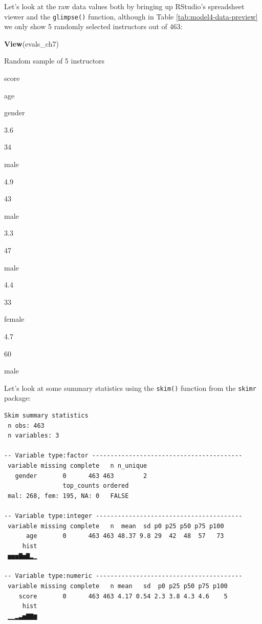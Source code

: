 \documentclass[12pt,]{krantz}
\makeatletter
\newenvironment{Shaded}{\begin{snugshade}}{\end{snugshade}}
\newcommand{\KeywordTok}[1]{\textcolor[rgb]{0.27,0.27,0.27}{\textbf{#1}}}
\newcommand{\StringTok}[1]{\textcolor[rgb]{0.5,0.5,0.5}{#1}}
\newcommand{\OperatorTok}[1]{\textcolor[rgb]{0.43,0.43,0.43}{\textbf{#1}}}
\newcommand{\NormalTok}[1]{#1}
\newenvironment{kframe}{%
\medskip{}
\setlength{\fboxsep}{.8em}
 \def\at@end@of@kframe{}%
 \ifinner\ifhmode%
  \def\at@end@of@kframe{\end{minipage}}%
  \begin{minipage}{\columnwidth}%
 \fi\fi%
 \def\FrameCommand##1{\hskip\@totalleftmargin \hskip-\fboxsep
 \colorbox{shadecolor}{##1}\hskip-\fboxsep
     \hskip-\linewidth \hskip-\@totalleftmargin \hskip\columnwidth}%
 \MakeFramed {\advance\hsize-\width
   \@totalleftmargin\z@ \linewidth\hsize
   \@setminipage}}%
 {\par\unskip\endMakeFramed%
 \at@end@of@kframe}
\renewenvironment{Shaded}{\begin{kframe}}{\end{kframe}}
\makeatother
\begin{document}
Let's look at the raw data values both by bringing up RStudio's
spreadsheet viewer and the \texttt{glimpse()} function, although in
Table \ref{tab:model4-data-preview} we only show 5 randomly selected
instructors out of 463:

\begin{Shaded}
\begin{Highlighting}[]
\KeywordTok{View}\NormalTok{(evals_ch7)}
\end{Highlighting}
\end{Shaded}

\label{tab:model4-data-preview}Random sample of 5 instructors

score

age

gender

3.6

34

male

4.9

43

male

3.3

47

male

4.4

33

female

4.7

60

male

Let's look at some summary statistics using the \texttt{skim()} function
from the \texttt{skimr} package:

\begin{Shaded}
\end{Shaded}

\begin{verbatim}
Skim summary statistics
 n obs: 463 
 n variables: 3 

-- Variable type:factor -----------------------------------------
 variable missing complete   n n_unique
   gender       0      463 463        2
                top_counts ordered
 mal: 268, fem: 195, NA: 0   FALSE

-- Variable type:integer ----------------------------------------
 variable missing complete   n  mean  sd p0 p25 p50 p75 p100
      age       0      463 463 48.37 9.8 29  42  48  57   73
     hist
 ▅▅▅▇▅▇▂▁

-- Variable type:numeric ----------------------------------------
 variable missing complete   n mean   sd  p0 p25 p50 p75 p100
    score       0      463 463 4.17 0.54 2.3 3.8 4.3 4.6    5
     hist
 ▁▁▂▃▅▇▇▆
\end{verbatim}
\end{document}
